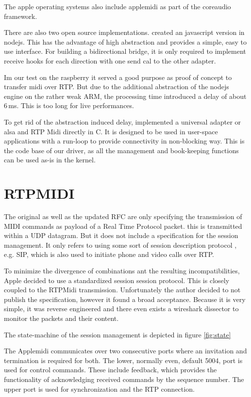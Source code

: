 \documentclass[paper=a4,fontsize=11pt,pagesize,bibtotoc]{scrartcl}
\begin{document}
	The apple operating systems also include applemidi as part of the coreaudio framework.
	
	
	There are also two open source implementations. 
	created an javascript version in nodejs. This has the advantage of high abstraction and provides a simple, easy to use interface. For building a bidirectional bridge, it is only required to implement receive hooks for each direction with one send cal to the other adapter.
	
	Im our test on the raspberry it served a good purpose as proof of concept to transfer midi over RTP. But due to the additional abstraction of the nodejs engine on the rather weak ARM, the processing time introduced a delay of about 6\,ms. This is too long for live performances.
	
	To get rid of the abstraction induced delay, 
	implemented a universal adapter or alsa and RTP Midi directly in C. It is designed to be used in user-space applications with a run-loop to provide connectivity in non-blocking way. This is the code base of our driver, as all the management and book-keeping functions can be used as-is in the kernel.
	
	\section{RTPMIDI}
	The original as well as the updated RFC
	are only specifying the transmission of MIDI commands as payload of a Real Time Protocol packet. this is transmitted within a UDP datagram. But it does not include a specification for the session management. It only refers to using some sort of session description protocol
	, e.g. SIP, which is also used to initiate phone and video calls over RTP.
	
	
	To minimize the divergence of combinations ant the resulting incompatibilities, Apple decided to use a standardized session session protocol. This is closely coupled to the RTPMidi transmission. Unfortunately the author decided to not publish the specification, however it found a broad acceptance. Because it is very simple, it was reverse engineered and there even exists a wireshark dissector to monitor the packets and their content.
	
	The state-machine of the session management is depicted in figure \ref{fig:state}
	
	
	The Applemidi communicates over two consecutive ports where an invitation and termination is required for both. The lower, normally even, default 5004, port is used for control commands. These include feedback, which provides the functionality of acknowledging received commands by the sequence number. The upper port is used for synchronization and the RTP connection.
	
\end{document}
